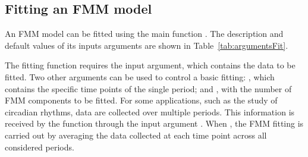 \subsection{Fitting an FMM model}\label{subsec:impl:FMMModel}
An FMM model can be fitted using the main function . The description and default values of its inputs arguments are shown in Table~\ref{tab:argumentsFit}. 

The fitting function  requires the  input argument, which contains the data to be fitted. Two other arguments can be used to control a basic fitting: , which contains the specific time points of the single period; and , with the number of FMM components to be fitted. For some applications, such as the study of circadian rhythms, data are collected over multiple periods. This information is received by the  function through the input argument . When , the FMM fitting is carried out by averaging the data collected at each time point across all considered periods. 

